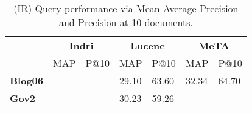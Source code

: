 \begin{table}[t]
\centering
{\small
    \begin{tabular}{|l|p{.65cm}p{.65cm}|p{.65cm}p{.65cm}|p{.65cm}p{.65cm}|}
    \hline &
    \multicolumn{2}{c|}{\textbf{Indri}} &
    \multicolumn{2}{c|}{\textbf{Lucene}} &
    \multicolumn{2}{c|}{\textbf{MeTA}} \\
    & MAP & P@10 & MAP & P@10 & MAP & P@10\\
    \hline
    \textbf{Blog06} & & & 29.10 & 63.60 & 32.34 & 64.70 \\
    \textbf{Gov2} & & & 30.23 & 59.26 & & \\
    \hline
\end{tabular}
\caption{(IR) Query performance via Mean Average Precision and Precision at 10
    documents.}
\label{table:ir-map}
}
\end{table}
